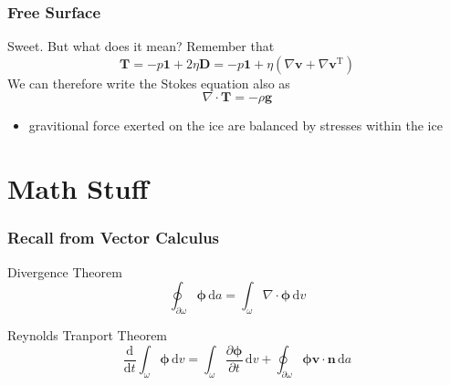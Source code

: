 \documentclass[hide notes,intlimits]{beamer}
\begin{document}
\begin{frame}
  \frametitle{Free Surface}
  Sweet. But what does it mean?
  Remember that 
  \begin{equation*}\mathbf{T} =  -p\mathbf{1} + 2\eta \mathbf{D} = -p\mathbf{1} + \eta\left(\nabla \mathbf{v} + \nabla \mathbf{v}^{\text{T}}\right)
  \end{equation*}
  We can therefore write the Stokes equation also as
 \begin{equation*}
    \nabla \cdot \mathbf{T} = - \rho \mathbf{g}
  \end{equation*}
  \begin{itemize}
    \item gravitional force exerted on the ice are balanced by stresses within the ice
  \end{itemize}
\end{frame}


\section{Math Stuff}

\begin{frame}
  \frametitle{Recall from Vector Calculus}
  \begin{block}{Divergence Theorem}
    \begin{equation}
      \oint_{\partial \omega} \boldsymbol{\phi} \,\text{d}a = 
      \int_{\omega} \nabla \cdot \boldsymbol{\phi} \, \text{d} v
    \end{equation}
  \end{block}
  \begin{block}{Reynolds Tranport Theorem}
    \begin{equation}
     \frac{\text{d}}{\text{d} t}\int_{\omega} \boldsymbol{\phi}\, \text{d} v =
     \int_{\omega} \frac{\partial \boldsymbol{\phi}}{\partial{t}} \, \text{d} v +
      \oint_{\partial \omega} \boldsymbol{\phi} \mathbf{v}\cdot\mathbf{n}\,\text{d}a 
    \end{equation}
  \end{block}
\end{frame}
\end{document}
